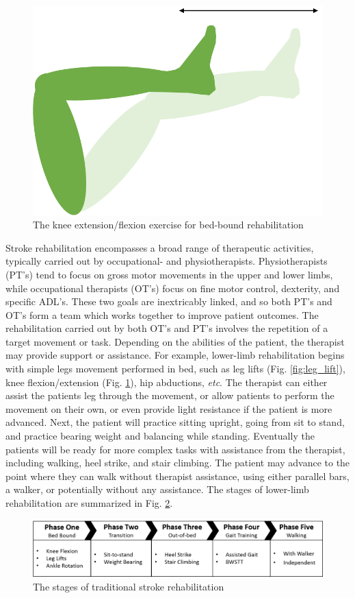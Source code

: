 \documentclass[12pt]{report}
\begin{document}
		\begin{figure}[h] 
		\centering
		\includegraphics[width=0.6\linewidth]{knee_extension}
		\caption{The knee extension/flexion exercise for bed-bound rehabilitation}
		\label{fig:knee_ext}
	\end{figure}

Stroke rehabilitation encompasses a broad range of therapeutic activities, typically carried out by occupational- and physiotherapists. Physiotherapists (PT's) tend to focus on gross motor movements in the upper and lower limbs, while occupational therapists (OT's) focus on fine motor control, dexterity, and specific ADL's. These two goals are inextricably linked, and so both PT's and OT's form a team which works together to improve patient outcomes. The rehabilitation carried out by both OT's and PT's involves the repetition of a target movement or task. Depending on the abilities of the patient, the therapist may provide support or assistance. For example, lower-limb rehabilitation begins with simple legs movement performed in bed, such as leg lifts (Fig. \ref{fig:leg_lift}), knee flexion/extension (Fig. \ref{fig:knee_ext}), hip abductions, \textit{etc}. The therapist can either assist the patients leg through the movement, or allow patients to perform the movement on their own, or even provide light resistance if the patient is more advanced. Next, the patient will practice sitting upright, going from sit to stand, and  practice bearing weight and balancing while standing. Eventually the patients will be ready for more complex tasks with assistance from the therapist, including walking, heel strike, and stair climbing. The patient may advance to the point where they can walk without therapist assistance, using either parallel bars, a walker, or potentially without any assistance. The stages of lower-limb rehabilitation are summarized in Fig. \ref{fig:stages}.


	\begin{figure}[h] 
		\centering
		\includegraphics[width=\linewidth]{Traditional_therapy}
		\caption{The stages of traditional stroke rehabilitation}
		\label{fig:stages}
	\end{figure}
\end{document}
